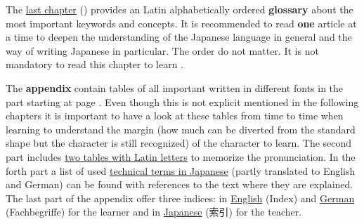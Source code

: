 
The \hyperref[chap:Terminology]{last chapter} ()
provides an Latin alphabetically ordered \textbf{glossary} about the most
important keywords and concepts. It is recommended to read \textbf{one} article
at a time to deepen the understanding of the Japanese language in general and
the way of writing Japanese in particular. The order do not matter. It is not
mandatory to read this chapter to learn \jtopic.

The \textbf{appendix} contain tables of all important \jtopic{} written in
different fonts in the  part starting at page
\pageref{chap:KanaTables}. Even though this is not explicit mentioned in the
following chapters it is important to have a look at these tables from time to
time when learning \jtopic{} to understand the margin (how much can be diverted
from the standard shape but the character is still recognized) of the character
to learn. The second part includes \hyperref[chap:RomajiTables]{two tables with
Latin letters} to memorize the pronunciation. In the forth part a list of used
\hyperref[chap:ListOfJapaneseTechnicalTerms]{technical terms in Japanese}
(partly translated to English and German) can be found with references to the
text where they are explained.  The last part of the appendix offer three
indices: in \hyperref[chap:EnglishIndex]{English} (Index) and
\hyperref[chap:GermanIndex]{German} (Fachbegriffe) for the learner and in
\hyperref[chap:JapaneseIndex]{Japanese} (索引) for the teacher.

